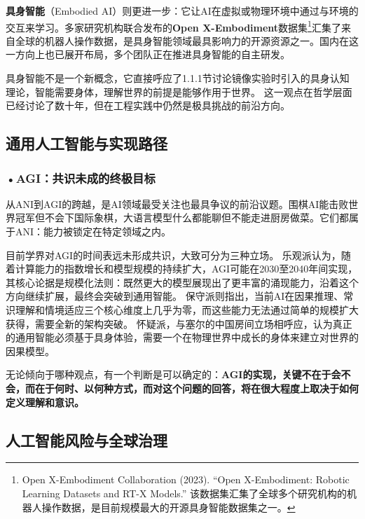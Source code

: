 \textbf{具身智能}（Embodied AI）则更进一步：它让AI在虚拟或物理环境中通过与环境的交互来学习。多家研究机构联合发布的\textbf{Open X-Embodiment}数据集\footnote{Open X-Embodiment Collaboration (2023). ``Open X-Embodiment: Robotic Learning Datasets and RT-X Models.'' 该数据集汇集了全球多个研究机构的机器人操作数据，是目前规模最大的开源具身智能数据集之一。}汇集了来自全球的机器人操作数据，是具身智能领域最具影响力的开源资源之一。国内在这一方向上也已展开布局，多个团队正在推进具身智能的自主研发。

具身智能不是一个新概念，它直接呼应了1.1.1节讨论镜像实验时引入的具身认知理论，智能需要身体，理解世界的前提是能够作用于世界。
这一观点在哲学层面已经讨论了数十年，但在工程实践中仍然是极具挑战的前沿方向。

\subsection{通用人工智能与实现路径}

\subsubsection*{\textbf{•AGI：共识未成的终极目标}}

从ANI到AGI的跨越，是AI领域最受关注也最具争议的前沿议题。围棋AI能击败世界冠军但不会下国际象棋，大语言模型什么都能聊但不能走进厨房做菜。它们都属于ANI：能力被锁定在特定领域之内。

目前学界对AGI的时间表远未形成共识，大致可分为三种立场。
乐观派认为，随着计算能力的指数增长和模型规模的持续扩大，AGI可能在2030至2040年间实现，其核心论据是规模化法则：既然更大的模型展现出了更丰富的涌现能力，沿着这个方向继续扩展，最终会突破到通用智能。
保守派则指出，当前AI在因果推理、常识理解和情境适应三个核心维度上几乎为零，而这些能力无法通过简单的规模扩大获得，需要全新的架构突破。
怀疑派，与塞尔的中国房间立场相呼应，认为真正的通用智能必须基于具身体验，需要一个在物理世界中成长的身体来建立对世界的因果模型。

无论倾向于哪种观点，有一个判断是可以确定的：\textbf{AGI的实现，关键不在于会不会，而在于何时、以何种方式，而对这个问题的回答，将在很大程度上取决于如何定义理解和意识。}

\subsection{人工智能风险与全球治理}

